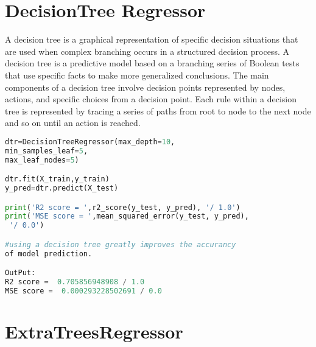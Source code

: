 \section{DecisionTree Regressor}

A decision tree is a graphical representation of specific decision situations that are used when complex branching occurs in a structured decision process. A decision tree is a predictive model based on a branching series of Boolean tests that use specific facts to make more generalized conclusions. The main components of a decision tree involve decision points represented by nodes, actions, and specific choices from a decision point. Each rule within a decision tree is represented by tracing a series of paths from root to node to the next node and so on until an action is reached.\cite{thomassey:2006}

	\begin{lstlisting}[language=Python]
dtr=DecisionTreeRegressor(max_depth=10,
min_samples_leaf=5,
max_leaf_nodes=5)

dtr.fit(X_train,y_train)
y_pred=dtr.predict(X_test)

print('R2 score = ',r2_score(y_test, y_pred), '/ 1.0')
print('MSE score = ',mean_squared_error(y_test, y_pred),
 '/ 0.0')

#using a decision tree greatly improves the accurancy 
of model prediction.

OutPut:
R2 score =  0.705856948908 / 1.0
MSE score =  0.000293228502691 / 0.0
\end{lstlisting}



\section{ExtraTreesRegressor}

